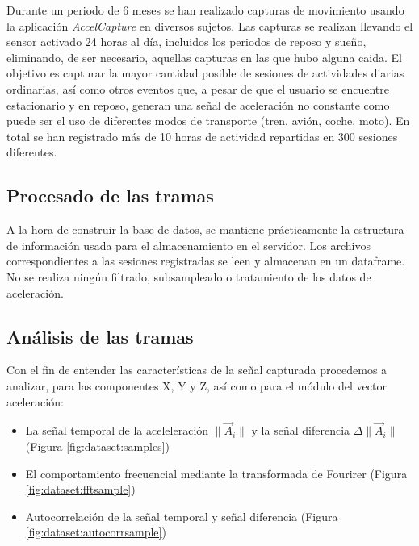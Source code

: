 Durante un periodo de 6 meses se han realizado capturas de movimiento usando la aplicación \textit{AccelCapture} en diversos sujetos. Las capturas se realizan llevando el sensor activado 24 horas al día, incluidos los periodos de reposo y sueño, eliminando, de ser necesario, aquellas capturas en las que hubo alguna caida. El objetivo es capturar la mayor cantidad posible de sesiones de actividades diarias ordinarias, así como otros eventos que, a pesar de que el usuario se encuentre estacionario y en reposo, generan una señal de aceleración no constante como puede ser el uso de diferentes modos de transporte (tren, avión, coche, moto). En total se han registrado más de 10 horas de actividad repartidas en 300 sesiones diferentes.

\subsection{Procesado de las tramas}

A la hora de construir la base de datos, se mantiene prácticamente la estructura de información usada para el almacenamiento en el servidor. Los archivos correspondientes a las sesiones registradas se leen y almacenan en un dataframe. No se realiza ningún filtrado, subsampleado o tratamiento de los datos de aceleración.

\subsection{Análisis de las tramas}

Con el fin de entender las características de la señal capturada procedemos a analizar, para las componentes X, Y y Z, así como para el módulo del vector aceleración:
\begin{itemize}
  \item La señal temporal de la aceleleración $\|\vec{A}_i\|$ y la señal diferencia $\Delta\|\vec{A}_i\|$
    (Figura \ref{fig:dataset:samples})
  \item El comportamiento frecuencial mediante la transformada de Fourirer (Figura \ref{fig:dataset:fftsample})
  \item Autocorrelación de la señal temporal y señal diferencia (Figura \ref{fig:dataset:autocorrsample})
\end{itemize}



